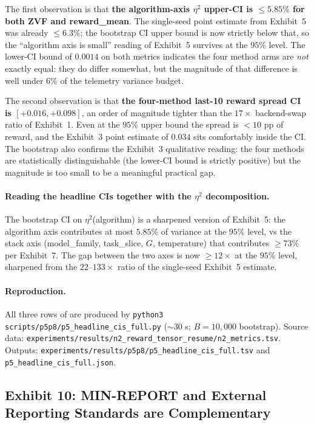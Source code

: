 The first observation is that \textbf{the algorithm-axis $\eta^{2}$
upper-CI is $\le 5.85\%$ for both ZVF and reward\_mean}. The
single-seed point estimate from Exhibit~5 was already $\le 6.3\%$;
the bootstrap CI upper bound is now strictly below that, so the
``algorithm axis is small'' reading of Exhibit~5 survives at the
$95\%$ level. The lower-CI bound of $0.0014$ on both metrics indicates
the four method arms are \emph{not} exactly equal: they do differ
somewhat, but the magnitude of that difference is well under $6\%$ of
the telemetry variance budget.

The second observation is that \textbf{the four-method last-10 reward
spread CI is $[+0.016, +0.098]$}, an order of magnitude tighter than
the $17{\times}$ backend-swap ratio of Exhibit~1. Even at the $95\%$
upper bound the spread is $< 10$ pp of reward, and the Exhibit~3
point estimate of $0.034$ sits comfortably inside the CI. The
bootstrap also confirms the Exhibit~3 qualitative reading: the four
methods are statistically distinguishable (the lower-CI bound is
strictly positive) but the magnitude is too small to be a meaningful
practical gap.

\paragraph{Reading the headline CIs together with the $\eta^{2}$
decomposition.} The bootstrap CI on $\eta^{2}$(algorithm) is a
sharpened version of Exhibit~5: the algorithm axis contributes at
most $5.85\%$ of variance at the $95\%$ level, vs the stack axis
(model\_family, task\_slice, $G$, temperature) that contributes
$\ge 73\%$ per Exhibit~7. The gap between the two axes is now
$\ge 12{\times}$ at the $95\%$ level, sharpened from the $22$--$133{\times}$
ratio of the single-seed Exhibit~5 estimate.

\paragraph{Reproduction.}
All three rows of  are produced by
\texttt{python3 scripts/p5p8/p5\_headline\_cis\_full.py}
($\sim$30 s; $B{=}10{,}000$ bootstrap). Source data:
\texttt{experiments/results/n2\_reward\_tensor\_resume/n2\_metrics.tsv}.
Outputs: \texttt{experiments/results/p5p8/p5\_headline\_cis\_full.tsv}
and \texttt{p5\_headline\_cis\_full.json}.

\subsection{Exhibit 10: MIN-REPORT and External Reporting Standards are Complementary}
\label{sec:p5-exhibit-external-alignment}
